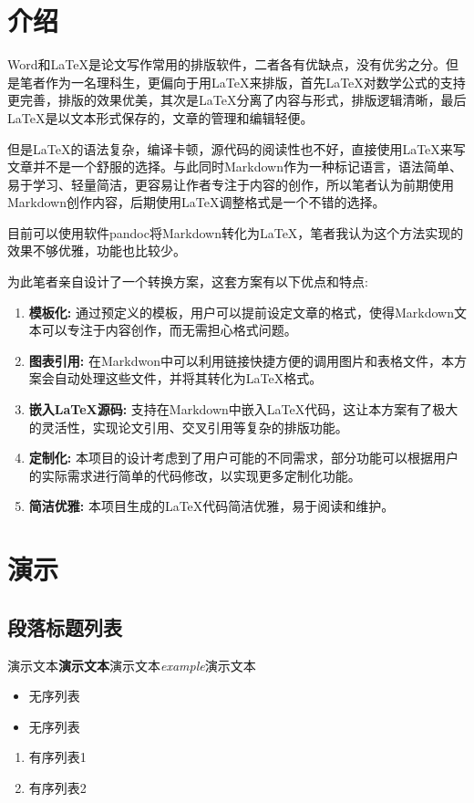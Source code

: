 \documentclass{ctexart}
\begin{document}
\section{介绍}

Word和LaTeX是论文写作常用的排版软件，二者各有优缺点，没有优劣之分。但是笔者作为一名理科生，更偏向于用LaTeX来排版，首先LaTeX对数学公式的支持更完善，排版的效果优美，其次是LaTeX分离了内容与形式，排版逻辑清晰，最后LaTeX是以文本形式保存的，文章的管理和编辑轻便。

但是LaTeX的语法复杂，编译卡顿，源代码的阅读性也不好，直接使用LaTeX来写文章并不是一个舒服的选择。与此同时Markdown作为一种标记语言，语法简单、易于学习、轻量简洁，更容易让作者专注于内容的创作，所以笔者认为前期使用Markdown创作内容，后期使用LaTeX调整格式是一个不错的选择。

目前可以使用软件pandoc将Markdown转化为LaTeX，笔者我认为这个方法实现的效果不够优雅，功能也比较少。

为此笔者亲自设计了一个转换方案，这套方案有以下优点和特点:

\begin{enumerate}
  \item {\textbf{模板化:} 通过预定义的模板，用户可以提前设定文章的格式，使得Markdown文本可以专注于内容创作，而无需担心格式问题。}\item {\textbf{图表引用:} 在Markdwon中可以利用链接快捷方便的调用图片和表格文件，本方案会自动处理这些文件，并将其转化为LaTeX格式。}\item {\textbf{嵌入LaTeX源码:} 支持在Markdown中嵌入LaTeX代码，这让本方案有了极大的灵活性，实现论文引用、交叉引用等复杂的排版功能。}\item {\textbf{定制化:} 本项目的设计考虑到了用户可能的不同需求，部分功能可以根据用户的实际需求进行简单的代码修改，以实现更多定制化功能。}\item {\textbf{简洁优雅:} 本项目生成的LaTeX代码简洁优雅，易于阅读和维护。}
\end{enumerate}
\section{演示}

\subsection{段落标题列表}

演示文本\textbf{演示文本}演示文本\emph{example}演示文本

\begin{itemize}
  \item {无序列表}\item {无序列表}
\end{itemize}
\begin{enumerate}
  \item {有序列表1}\item {有序列表2}
\end{enumerate}
\end{document}
